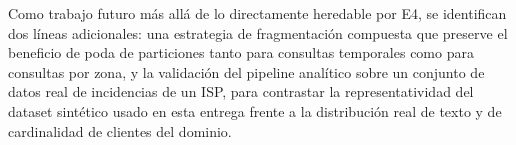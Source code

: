 Como trabajo futuro más allá de lo directamente heredable por E4, se identifican dos líneas
adicionales: una estrategia de fragmentación compuesta que preserve el beneficio de poda de
particiones tanto para consultas temporales como para consultas por zona, y la validación del
pipeline analítico sobre un conjunto de datos real de incidencias de un ISP, para contrastar la
representatividad del dataset sintético usado en esta entrega frente a la distribución real de
texto y de cardinalidad de clientes del dominio.
